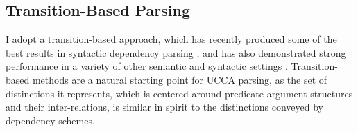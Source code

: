 \documentclass[11pt]{article}
\newcommand{\secref}[1]{Section~\ref{#1}}
\newcommand{\figref}[1]{Figure~\ref{#1}}
\begin{document}
%
%

\subsection{Transition-Based Parsing}\label{sec:transition_based}

I adopt a transition-based approach, which has recently produced some of the best
results in syntactic dependency parsing
\cite{dyer2015transition,ballesteros2015improved}, and has also demonstrated
strong performance in a variety of other semantic and syntactic settings
\cite[among others]{maier2015discontinuous,wang2015transition}.
Transition-based methods are a natural starting point for UCCA parsing,
as the set of distinctions it represents, which is centered around predicate-argument
structures and their inter-relations, is similar in spirit to the distinctions
conveyed by dependency schemes.

\end{document}
